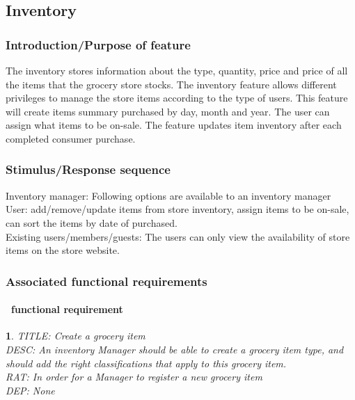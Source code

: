 \documentclass{scrreprt}
\theoremstyle{funreq}
\newtheorem{funreq}{}
\begin{document}
	\subsection{Inventory}
	\subsubsection{Introduction/Purpose of feature}
	The inventory stores information about the type, quantity, price and price of all the items that the grocery store stocks. The inventory feature allows different privileges to manage the store items according to the type of users. This feature will create items summary purchased by day, month and year. The user can assign what items to be on-sale. The feature updates item inventory after each completed consumer purchase.
	
	\subsubsection{Stimulus/Response sequence}
	Inventory manager: Following options are available to an inventory manager \\
	User: add/remove/update items from store inventory, assign items to be on-sale, can sort the items by date of purchased.\\
	Existing users/members/guests:  The users can only view the availability of store items on the store website.\\
	
	\subsubsection{Associated functional requirements}
	\paragraph[]{\Subsectionname ~functional requirement }
	\begin{funreq}
		
		\label{inventory_create}
		TITLE: Create a grocery item\\
		DESC: An inventory Manager should be able to create a grocery item type, and should add the right classifications that apply to this grocery item. \\
		RAT: In order for a Manager to register a new grocery item\\
		DEP: None\\
	\end{funreq}
	
\end{document}
